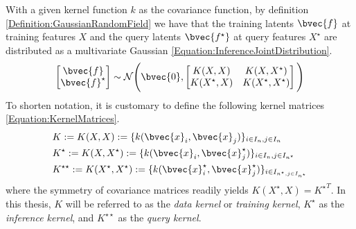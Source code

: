 				With a given kernel function $k$ as the covariance function, by definition \ref{Definition:GaussianRandomField} we have that the training latents $\bvec{f}$ at training features $X$ and the query latents $\bvec{f^{\star}}$ at query features $X^{\star}$ are distributed as a multivariate Gaussian \eqref{Equation:InferenceJointDistribution}. \begin{equation}
					\begin{bmatrix}
						\bvec{f} \\ \bvec{f}^{\star}
					\end{bmatrix}
					\sim \mathcal{N}\Bigg(\bvec{0}, \begin{bmatrix}
														K(X, X) & K(X, X^{\star}) \\
														K(X^{\star}, X) & K(X^{\star}, X^{\star}) \\
													\end{bmatrix}  \Bigg)
				\label{Equation:InferenceJointDistribution}
				\end{equation} To shorten notation, it is customary to define the following kernel matrices \eqref{Equation:KernelMatrices}. \begin{equation}
					\begin{aligned}
						& K := K(X, X) := \{k(\bvec{x}_{i}, \bvec{x}_{j})\}_{i \in I_{n}, j \in I_{n}} \\
						& K^{\star} := K(X, X^{\star}) := \{k(\bvec{x}_{i}, \bvec{x}^{\star}_{j})\}_{i \in I_{n}, j \in I_{n^{\star}}} \\
						& K^{\star \star} := K(X^{\star}, X^{\star}) := \{k(\bvec{x}^{\star}_{i}, \bvec{x}^{\star}_{j})\}_{i \in I_{n^{\star}, j \in I_{n^{\star}}}}
					\end{aligned}
				\label{Equation:KernelMatrices}
				\end{equation} where the symmetry of covariance matrices readily yields $K(X^{\star}, X) = {K^{\star}}^{T}$. In this thesis, $K$ will be referred to as the \textit{data kernel} or \textit{training kernel}, $K^{\star}$ as the \textit{inference kernel}, and $K^{\star \star}$ as the \textit{query kernel}.
					
